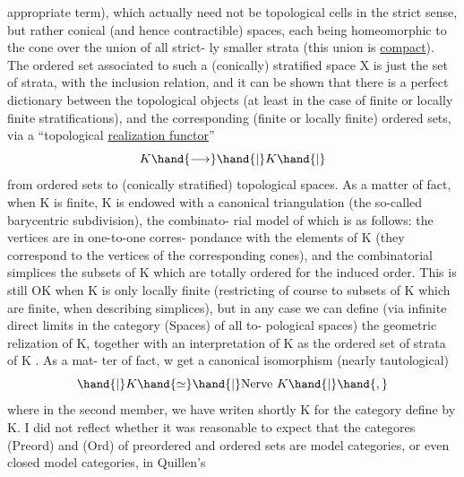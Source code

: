 
appropriate term), which actually need not be topological cells in the
strict sense, but rather conical (and hence contractible) spaces,
each being homeomorphic to the cone  over the union of all strict-%
\margin{$\times$} ly smaller strata (this union is \uline{compact}). The ordered set associated
to such a (conically) stratified space X is just the set of \inserted{[closed]} strata,
with the inclusion relation, and it can be shown that there is a perfect
dictionary between the topological objects (at least in the case of
finite or locally finite stratifications), and the corresponding (finite
or locally finite) ordered sets, via a ``topological \uline{realization functor}''
\[ K \hand{\longrightarrow} \hand{|}K\hand{|} \]
from ordered sets to (conically stratified) topological spaces. As a
\margin{$\times$} matter of fact, when K is finite, \hand{|}K\hand{|} is endowed with a canonical
triangulation (the so-called barycentric subdivision), the combinato-%
rial model of which  is as follows: the vertices are in one-to-one corres-%
pondance with the elements of K (they correspond to the vertices of the
corresponding cones), and the combinatorial simplices  the  subsets
of K which are totally ordered for the induced order. This is still OK
when K is only locally finite (restricting of course to subsets of K
which are finite, when describing simplices), but in any case we can
define (via infinite direct limits in the category (Spaces) of all to-%
pological spaces) the geometric relization of K,  together with
an interpretation of K as the ordered set of strata of \hand{|}K\hand{|} . As a mat-%
ter of fact, w get a canonical isomorphism (nearly tautological)
\[ \hand{|}K \hand{\simeq} \hand{|}\text{Nerve } K\hand{|} \hand{,} \]
where in the second member, we have writen shortly K for the category
define by K. I did not reflect whether it was reasonable to expect
that the categores (Preord) and (Ord) of preordered and ordered sets
are model categories, or even closed model categories, in Quillen's
